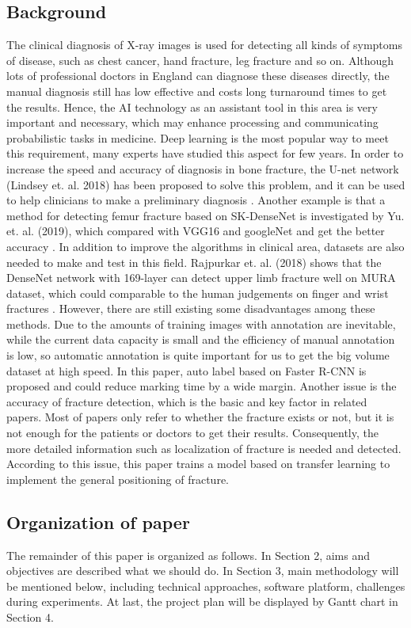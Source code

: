 \documentclass[12pt,oneside,a4paper]{article}
\begin{document}
\subsection{Background}
The clinical diagnosis of X-ray images is used for detecting all kinds of symptoms of disease, such as chest cancer, hand fracture, leg fracture and so on.  Although lots of professional doctors in England can diagnose these diseases directly, the manual diagnosis still has low effective and costs long turnaround times to get the results.  Hence, the AI technology as an assistant tool in this area is very important and necessary, which may enhance processing and communicating probabilistic tasks in medicine. Deep learning is the most popular way to meet this requirement, many experts have studied this aspect for few years. In order to increase the speed and accuracy of diagnosis in bone fracture, the U-net network (Lindsey et. al. 2018) has been proposed to solve this problem, and it can be used to help clinicians to make a preliminary diagnosis \cite{b1}. Another example is that a method for detecting femur fracture based on SK-DenseNet is investigated by Yu. et. al. (2019), which compared with VGG16 and googleNet and get the better accuracy \cite{b2}. In addition to improve the algorithms in clinical area, datasets are also needed to make and test in this field. Rajpurkar et. al. (2018) shows that the DenseNet network with 169-layer can detect upper limb fracture well on MURA dataset, which could comparable to the human judgements on finger and wrist fractures \cite{b3}. However, there are still existing some disadvantages among these methods. Due to the amounts of training images with annotation are inevitable, while the current data capacity is small and the efficiency of manual annotation is low, so automatic annotation is quite important for us to get the big volume dataset at high speed. In this paper, auto label based on Faster R-CNN \cite{b4} is proposed and could reduce marking time by a wide margin. Another issue is the accuracy of fracture detection, which is the basic and key factor in related papers. Most of papers only refer to whether the fracture exists or not, but it is not enough for the patients or doctors to get their results. Consequently, the more detailed information such as localization of fracture is needed and detected. According to this issue, this paper trains a model based on transfer learning to implement the general positioning of fracture.

\subsection{Organization of paper}
The remainder of this paper is organized as follows. In Section 2, aims and objectives are described what we should do. In Section 3, main methodology will be mentioned below, including technical approaches, software platform, challenges during experiments. At last, the project plan will be displayed by Gantt chart in Section 4.
\end{document}

